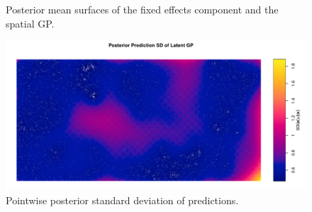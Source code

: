 \documentclass[]{interact}
\begin{document}
\begin{figure}[h]



\caption{Posterior mean surfaces of the fixed effects component and the
spatial GP.}
\label{beimean}
\end{figure}

\begin{figure}[h]
\includegraphics[width=\textwidth]{figures/bei_sd.pdf}
\caption{Pointwise posterior standard deviation of predictions.}
\label{beisd}
\end{figure}
\end{document}
